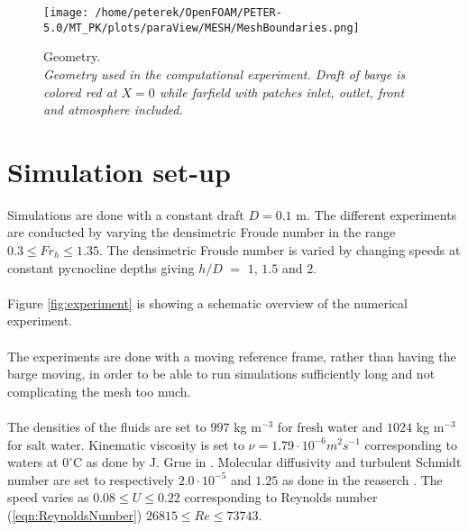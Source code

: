 \documentclass[a4paper, 12pt]{report}
\begin{document}
\begin{figure}[H]
	\centering
	\texttt{[image: /home/peterek/OpenFOAM/PETER-5.0/MT\_PK/plots/paraView/MESH/MeshBoundaries.png]}
	\caption{Geometry. \\ \textit{Geometry used in the computational experiment. Draft of barge is colored red at $X = 0$ while farfield with patches inlet, outlet, front and atmosphere included.}}
	\label{fig:domain}
\end{figure}

\section{Simulation set-up}
Simulations are done with a constant draft $D = 0.1$ m.  The different experiments are conducted by varying the densimetric Froude number in the range $0.3 \leq Fr_h \leq 1.35$.  The densimetric Froude number is varied by changing speeds at constant pycnocline depths giving $h/D$ $=$ $1$, $1.5$ and $2$.\\
\\
Figure \ref{fig:experiment} is showing a schematic overview of the numerical experiment.\\
\\
The experiments are done with a moving reference frame, rather than having the barge moving, in order to be able to run simulations sufficiently long and not complicating the mesh too much.\\
\\
The densities of the fluids are set to $997$ kg m$^{-3}$ for fresh water and $1024$ kg m$^{-3}$ for salt water. Kinematic viscosity is set to $\nu = 1.79 \cdot 10^{-6} m^2 s^{-1}$ corresponding to waters at $0^{\circ}$C as done by J. Grue in \cite{Grue}. Molecular diffusivity and turbulent Schmidt number are set to respectively $2.0 \cdot 10^{-5}$ and $1.25$ as done in the reaserch \cite{Krpan}. The speed  varies as $0.08\leq U \leq 0.22$ corresponding to Reynolds number (\ref{eqn:ReynoldsNumber}) $26815 \leq Re \leq 73743$.\\
\\
\end{document}
